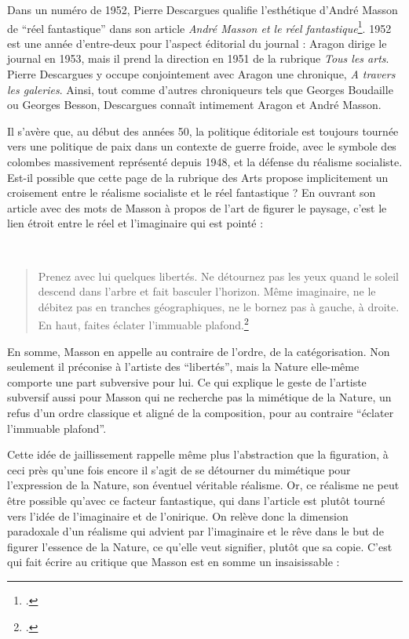 Dans un numéro de 1952, Pierre Descargues qualifie l’esthétique d’André Masson de \enquote{réel fantastique} dans son article \emph{André Masson et le réel fantastique}\footcite{reelfantastique}. 1952 est une année d’entre-deux pour l’aspect éditorial du journal : Aragon dirige le journal en 1953, mais il prend la direction en 1951 de la rubrique \emph{Tous les arts}. Pierre Descargues y occupe conjointement avec Aragon une chronique, \emph{A travers les galeries}. Ainsi, tout comme d’autres chroniqueurs tels que Georges Boudaille ou Georges Besson, Descargues connaît intimement Aragon et André Masson. 

	Il s'avère que, au début des années 50, la politique éditoriale est toujours tournée vers une politique de paix dans un contexte de guerre froide, avec le symbole des colombes massivement représenté depuis 1948, et la défense du réalisme socialiste. Est-il possible que cette page de la rubrique des Arts propose implicitement un croisement entre le réalisme socialiste et le réel fantastique ? En ouvrant son article avec des mots de Masson à propos de l’art de figurer le paysage, c’est le lien étroit entre le réel et l’imaginaire qui est pointé : 

 \begin{quote}
Prenez avec lui quelques libertés. Ne détournez pas les yeux quand le soleil descend dans l’arbre et fait basculer l’horizon. Même imaginaire, ne le débitez pas en tranches géographiques, ne le bornez pas à gauche, à droite. En haut, faites éclater l’immuable plafond.\footcite{reelfantastique}\end{quote}

	 En somme, Masson en appelle au contraire de l’ordre, de la catégorisation. Non seulement il préconise à l’artiste des \enquote{libertés}, mais la Nature elle-même comporte une part subversive pour lui. Ce qui explique le geste de l’artiste subversif aussi pour Masson qui ne recherche pas la mimétique de la Nature, un refus d’un ordre classique et aligné de la composition, pour au contraire \enquote{éclater l’immuable plafond}.

	  Cette idée de jaillissement rappelle même plus l’abstraction que la figuration, à ceci près qu’une fois encore il s’agit de se détourner du mimétique pour l’expression de la Nature, son éventuel véritable réalisme. Or, ce réalisme ne peut être possible qu’avec ce facteur fantastique, qui dans l’article est plutôt tourné vers l’idée de l’imaginaire et de l’onirique. On relève donc la dimension paradoxale d’un réalisme qui advient par l’imaginaire et le rêve dans le but de figurer l’essence de la Nature, ce qu’elle veut signifier, plutôt que sa copie. C’est qui fait écrire au critique que Masson est en somme un insaisissable : 
 
